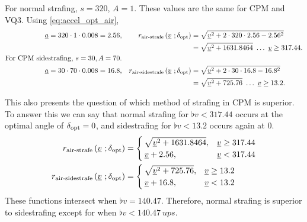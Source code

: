 For normal strafing, $s = 320$, $A = 1$. These values are the same for CPM and VQ3. Using \eqref{eq:accel_opt_air},
\begin{align*}
\flat{a} = 320\cdot 1\cdot 0.008 = 2.56, && r_{\text{air-strafe}}\left(\flat{v}\ ;\delta_{\opt} \right) &= \sqrt{\flat{v}^2 + 2\cdot 320 \cdot 2.56 - 2.56^2}\\
&& &= \sqrt{\flat{v}^2 + 1631.8464}\ \ldots\ \flat{v}\ge 317.44.\\
\text{For CPM sidestrafing, }s = 30, A = 70.\\
\flat{a} = 30\cdot 70\cdot 0.008 = 16.8, && r_{\text{air-sidestrafe}}\left(\flat{v}\ ;\delta_{\opt} \right) &= \sqrt{\flat{v}^2 + 2\cdot 30 \cdot 16.8 - 16.8^2}\\
&& &= \sqrt{\flat{v}^2 + 725.76}\ \ldots\ \flat{v}\ge 13.2.
\end{align*}

This also presents the question of which method of strafing in CPM is superior.
To answer this we can say that normal strafing for $\flat{v} < 317.44$ occurs at the optimal angle of $\delta_{\operatorname{opt}} = 0$, and sidestrafing for $\flat{v} < 13.2$ occurs again at $0$.
\begin{align*}
r_{\text{air-strafe}}\left(\flat{v}\ ;\delta_{\opt} \right) &= \begin{cases}
\sqrt{\flat{v}^2 + 1631.8464}, &\flat{v}\ge 317.44\\
\flat{v} + 2.56, &\flat{v} < 317.44
\end{cases}\\
r_{\text{air-sidestrafe}}\left(\flat{v}\ ;\delta_{\opt} \right) &= \begin{cases}
\sqrt{\flat{v}^2 + 725.76}, &\flat{v}\ge 13.2\\
\flat{v} + 16.8, &\flat{v} < 13.2
\end{cases}\\
\end{align*}
These functions intersect when $\flat{v} = 140.47$. Therefore, normal strafing is superior to sidestrafing except for when $\flat{v} < \qty{140.47}{ups}$.


